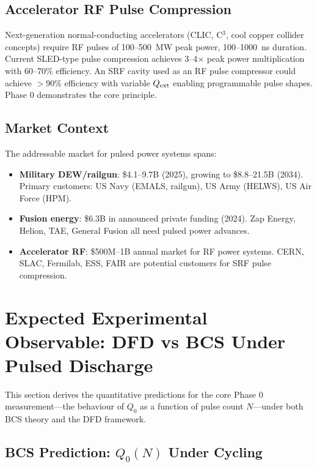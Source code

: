 \documentclass[11pt]{article}
\newcommand{\Qext}{Q_{\rm ext}}
\newcommand{\Qzero}{Q_0}
\begin{document}
\subsection{Accelerator RF Pulse Compression}

Next-generation normal-conducting accelerators (CLIC, C$^3$, cool
copper collider concepts) require RF pulses of 100--500~MW peak
power, 100--1000~ns duration. Current SLED-type pulse compression
achieves 3--4$\times$ peak power multiplication with 60--70\%
efficiency. An SRF cavity used as an RF pulse compressor could
achieve $>$90\% efficiency with variable $\Qext$ enabling
programmable pulse shapes. Phase 0 demonstrates the core principle.

\subsection{Market Context}

The addressable market for pulsed power systems spans:
\begin{itemize}[nosep]
  \item \textbf{Military DEW/railgun}: \$4.1--9.7B (2025),
    growing to \$8.8--21.5B (2034). Primary customers: US Navy
    (EMALS, railgun), US Army (HELWS), US Air Force (HPM).
  \item \textbf{Fusion energy}: \$6.3B in announced private
    funding (2024). Zap Energy, Helion, TAE, General Fusion all
    need pulsed power advances.
  \item \textbf{Accelerator RF}: \$500M--1B annual market for
    RF power systems. CERN, SLAC, Fermilab, ESS, FAIR are
    potential customers for SRF pulse compression.
\end{itemize}

\section{Expected Experimental Observable: DFD vs BCS Under Pulsed Discharge}
\label{sec:observable}

This section derives the quantitative predictions for the core
Phase 0 measurement---the behaviour of $\Qzero$ as a function of
pulse count $N$---under both BCS theory and the DFD framework.

\subsection{BCS Prediction: $\Qzero(N)$ Under Cycling}
\end{document}
